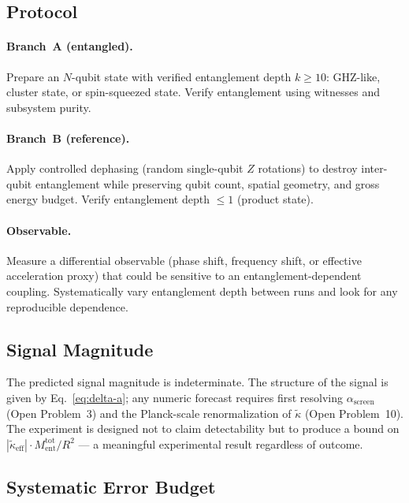\documentclass[12pt,letterpaper]{article}
\theoremstyle{plain}
\theoremstyle{definition}
\theoremstyle{remark}
\newcommand{\kt}{\tilde{\kappa}}
\newcommand{\kteff}{\tilde{\kappa}_{\mathrm{eff}}}
\newcommand{\Ment}{M_{\mathrm{ent}}}
\newcommand{\asc}{\alpha_{\mathrm{screen}}}
\begin{document}
\subsection{Protocol}

\paragraph{Branch~A (entangled).}
Prepare an $N$-qubit state with verified entanglement depth $k \geq 10$: GHZ-like, cluster
state, or spin-squeezed state.  Verify entanglement using witnesses and subsystem purity.

\paragraph{Branch~B (reference).}
Apply controlled dephasing (random single-qubit $Z$ rotations) to destroy inter-qubit
entanglement while preserving qubit count, spatial geometry, and gross energy budget.
Verify entanglement depth $\leq 1$ (product state).

\paragraph{Observable.}
Measure a differential observable (phase shift, frequency shift, or effective acceleration
proxy) that could be sensitive to an entanglement-dependent coupling.  Systematically vary
entanglement depth between runs and look for any reproducible dependence.

\subsection{Signal Magnitude}

The predicted signal magnitude is indeterminate.  The structure of the signal is given by
Eq.~\eqref{eq:delta-a}; any numeric forecast requires first resolving $\asc$ (Open
Problem~3) and the Planck-scale renormalization of $\kt$ (Open Problem~10).  The experiment
is designed not to claim detectability but to produce a bound on
$|\kteff| \cdot \Ment^{\mathrm{tot}} / R^{2}$ --- a meaningful experimental result regardless
of outcome.

\subsection{Systematic Error Budget}
\end{document}
